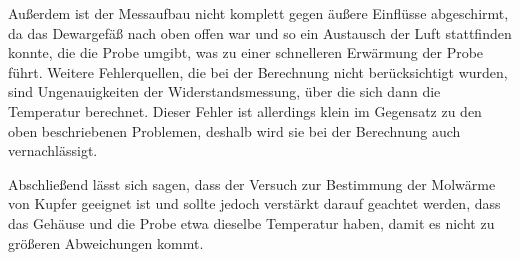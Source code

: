 Außerdem ist der Messaufbau nicht komplett gegen äußere Einflüsse abgeschirmt, da das Dewargefäß nach oben offen war und so ein Austausch der Luft stattfinden konnte, die die Probe umgibt, was zu einer schnelleren Erwärmung der Probe führt. Weitere Fehlerquellen, die bei der Berechnung nicht berücksichtigt wurden, sind Ungenauigkeiten der Widerstandsmessung, über die sich dann die Temperatur berechnet. Dieser Fehler ist allerdings klein im Gegensatz zu den oben beschriebenen Problemen, deshalb wird sie bei der Berechnung auch vernachlässigt.

Abschließend lässt sich sagen, dass der Versuch zur Bestimmung der Molwärme von Kupfer geeignet ist und sollte jedoch verstärkt darauf geachtet werden, dass das Gehäuse und die Probe etwa dieselbe Temperatur haben, damit es nicht zu größeren Abweichungen kommt.


